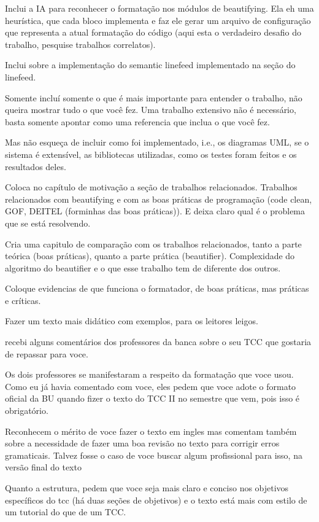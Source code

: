Inclui a IA para reconhecer o formatação nos módulos de beautifying. Ela eh
uma heurística, que cada bloco implementa e faz ele gerar um arquivo de
configuração que representa a atual formatação do código (aqui esta o
verdadeiro desafio do trabalho, pesquise trabalhos correlatos).

Inclui sobre a implementação  do semantic linefeed implementado na seção do
linefeed.

Somente incluí somente o que é mais importante para entender o trabalho, não
queira mostrar tudo o que você fez. Uma trabalho extensivo não é necessário,
basta somente apontar como uma referencia que inclua o que você fez.

Mas não esqueça de incluir como foi implementado, i.e., os diagramas UML, se
o sistema é extensível, as bibliotecas utilizadas, como os testes foram
feitos e os resultados deles.

Coloca no capítulo de motivação a seção de trabalhos relacionados. Trabalhos
relacionados com beautifying e com as boas práticas de programação (code clean,
GOF, DEITEL (forminhas das boas práticas)). E deixa claro qual é o problema
que se está resolvendo.

Cria uma capitulo de comparação com os trabalhos relacionados, tanto a parte
teórica (boas práticas), quanto a parte prática (beautifier). Complexidade do
algoritmo do beautifier e o que esse trabalho tem de diferente dos outros.

Coloque evidencias de que funciona o formatador, de boas práticas, mas
práticas e críticas.

Fazer um texto mais didático com exemplos, para os leitores leigos.


recebi alguns comentários dos professores da banca sobre o seu TCC que
gostaria de repassar para voce.

Os dois professores se manifestaram a respeito da formatação que voce
usou. Como eu já havia comentado com voce, eles pedem que voce adote o
formato oficial da BU quando fizer o texto do TCC II no semestre que
vem, pois isso é obrigatório.

Reconhecem o mérito de voce fazer o texto em ingles mas comentam
também sobre a necessidade de fazer uma boa revisão no texto para
corrigir erros gramaticais. Talvez fosse o caso de voce buscar algum
profissional para isso, na versão final do texto

Quanto a estrutura, pedem que voce seja mais claro e conciso nos
objetivos específicos do tcc (há duas seções de objetivos) e o texto
está mais com estilo de um tutorial do que de um TCC.

